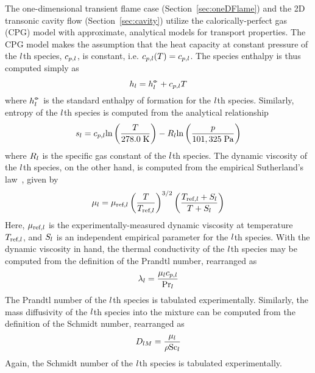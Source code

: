 The one-dimensional transient flame case (Section~\ref{sec:oneDFlame}) and the 2D transonic cavity flow (Section~\ref{sec:cavity}) utilize the calorically-perfect gas (CPG) model with approximate, analytical models for transport properties. The CPG model makes the assumption that the heat capacity at constant pressure of the $l$th species, $c_{p,l}$, is constant, i.e. $c_{p,l}(T) = c_{p,l}$. The species enthalpy is thus computed simply as
%
\begin{equation}\label{eq:cpgEnthSpec}
	h_{l} = h^{\circ\kern-0.47em-}_{l} + c_{p,l} T
\end{equation}
%
where $h^{\circ\kern-0.47em-}_{l}$ is the standard enthalpy of formation for the $l$th species. Similarly, entropy of the $l$th species is computed from the analytical relationship
%
\begin{equation}\label{eq:cpgEntropySpec}
	s_{l} = c_{p,l} \text{ln}\left(\frac{T}{278.0 \; \text{K}}\right) - R_{l} \text{ln}\left(\frac{p}{101,325 \; \text{Pa}}\right)
\end{equation}
%
where $R_{l}$ is the specific gas constant of the $l$th species. The dynamic viscosity of the $l$th species, on the other hand, is computed from the empirical Sutherland's law~\cite{Sutherland1893}, given by
%
\begin{equation}\label{eq:viscSuthSpec}
	\mu_{l} = \mu_{\text{ref},l} \left( \frac{T}{T_{\text{ref},l}} \right)^{3/2} \left( \frac{T_{\text{ref},l} + S_{l}}{T + S_{l}} \right)
\end{equation}
%
Here, $\mu_{\text{ref},l}$ is the experimentally-measured dynamic viscosity at temperature $T_{\text{ref},l}$, and $S_{l}$ is an independent empirical parameter for the $l$th species. With the dynamic viscosity in hand, the thermal conductivity of the $l$th species may be computed from the definition of the Prandtl number, rearranged as
%
\begin{equation}\label{eq:cpgThermCondSpec}
	\lambda_{l} = \frac{\mu_{l} c_{p,l}}{\text{Pr}_{l}}
\end{equation}
%
The Prandtl number of the $l$th species is tabulated experimentally. Similarly, the mass diffusivity of the $l$th species into the mixture can be computed from the definition of the Schmidt number, rearranged as
%
\begin{equation}\label{eq:cpgMassDiffSpec}
	D_{l M} = \frac{\mu_{l}}{\rho \text{Sc}_{l}}
\end{equation}
%
Again, the Schmidt number of the $l$th species is tabulated experimentally.

